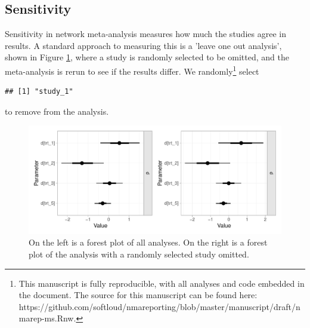 \documentclass[12pt]{article}\usepackage[]{graphicx}\usepackage[]{color}
\makeatletter
\def\maxwidth{ %
  \ifdim\Gin@nat@width>\linewidth
    \linewidth
  \else
    \Gin@nat@width
  \fi
}
\newenvironment{kframe}{%
 \def\at@end@of@kframe{}%
 \ifinner\ifhmode%
  \def\at@end@of@kframe{\end{minipage}}%
  \begin{minipage}{\columnwidth}%
 \fi\fi%
 \def\FrameCommand##1{\hskip\@totalleftmargin \hskip-\fboxsep
 \colorbox{shadecolor}{##1}\hskip-\fboxsep
     \hskip-\linewidth \hskip-\@totalleftmargin \hskip\columnwidth}%
 \MakeFramed {\advance\hsize-\width
   \@totalleftmargin\z@ \linewidth\hsize
   \@setminipage}}%
 {\par\unskip\endMakeFramed%
 \at@end@of@kframe}
\newenvironment{knitrout}{}{} %
\makeatother
\begin{document}
\subsection{Sensitivity}





Sensitivity in network meta-analysis measures how much the studies agree in results. A standard approach to measuring this is a 'leave one out analysis', shown in Figure \ref{fig:one}, where a study is randomly selected to be omitted, and the meta-analysis is rerun to see if the results differ. We randomly\footnote{
This manuscript is fully reproducible, with all analyses and code embedded in the document. The source for this manuscript can be found here: https://github.com/softloud/nmareporting/blob/master/manuscript/draft/nmarep-ms.Rnw.
} select

\begin{knitrout}
\color{fgcolor}\begin{kframe}
\begin{verbatim}
## [1] "study_1"
\end{verbatim}
\end{kframe}
\end{knitrout}

to remove from the analysis.

\begin{figure}
\begin{knitrout}
\color{fgcolor}
\includegraphics[width=\maxwidth]{figure/forest-1} 

\end{knitrout}

\caption{On the left is a forest plot of all analyses. On the right is a forest plot of the analysis with a randomly selected study omitted.}
\label{fig:one}
\end{figure}
\end{document}
